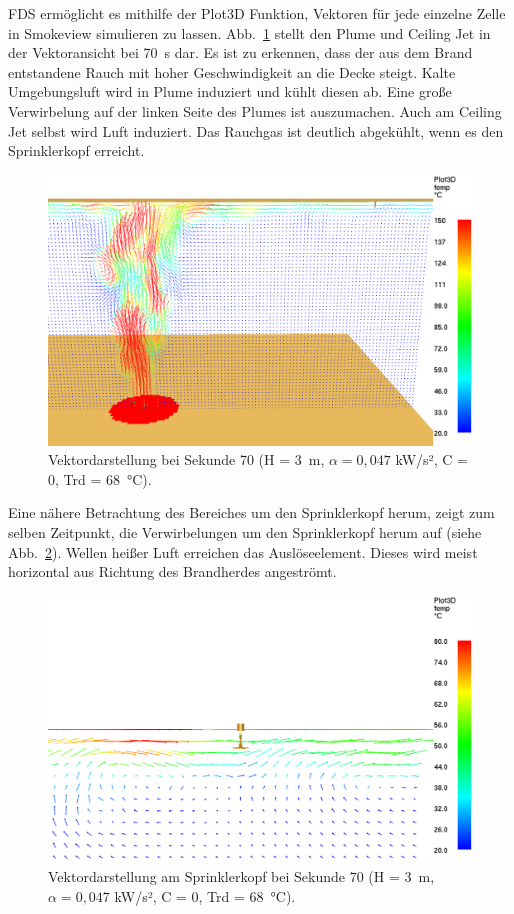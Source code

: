 FDS ermöglicht es mithilfe der Plot3D Funktion, Vektoren für jede einzelne Zelle in Smokeview simulieren zu lassen. Abb.~\ref{fig:VektorenPlume} stellt den Plume und Ceiling Jet in der Vektoransicht bei 70~s dar. Es ist zu erkennen, dass der aus dem Brand entstandene Rauch mit hoher Geschwindigkeit an die Decke steigt. Kalte Umgebungsluft wird in Plume induziert und kühlt diesen ab. Eine große Verwirbelung auf der linken Seite des Plumes ist auszumachen. Auch am Ceiling Jet selbst wird Luft induziert. Das Rauchgas ist deutlich abgekühlt, wenn es den Sprinklerkopf erreicht. 
\begin{figure}
    \centering
    \includegraphics[width=\textwidth]{images/FDSBilder/VektorenPlume.png}
    \caption{Vektordarstellung bei Sekunde 70 (H = 3~m, $\alpha=0,047$ kW/s², C = 0, Trd = 68~°C).}
    \label{fig:VektorenPlume}
\end{figure}
Eine nähere Betrachtung des Bereiches um den Sprinklerkopf herum, zeigt zum selben Zeitpunkt, die Verwirbelungen um den Sprinklerkopf herum auf (siehe Abb.~\ref{fig:VektorenSprinkler}). Wellen heißer Luft erreichen das Auslöseelement. Dieses wird meist horizontal aus Richtung des Brandherdes angeströmt.
\begin{figure}
    \centering
    \includegraphics[width=\textwidth]{images/FDSBilder/VektorSprinklerkopf.png}
    \caption{Vektordarstellung am Sprinklerkopf bei Sekunde 70 (H = 3~m, $\alpha=0,047$ kW/s², C = 0, Trd = 68~°C).}
    \label{fig:VektorenSprinkler}
\end{figure}
